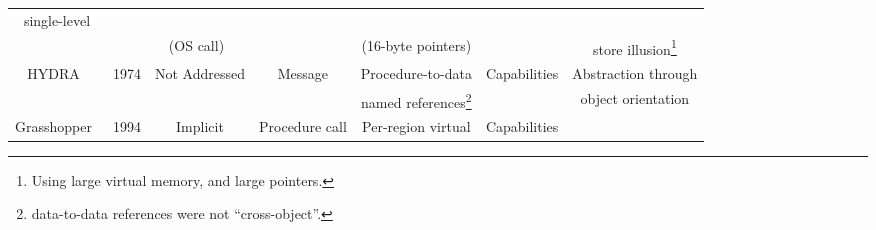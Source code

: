 {\begin{table}
\begin{minipage}{\textwidth}
\begin{tabular}{c c c c c c c}
                single-level                                                                                                                                                                                                                                                                                                                                                                \\
                                                                        &                                           & (OS call)~\cite{shapiro:usenix02}         &                        & (16-byte pointers)                                                            &                          & store illusion\footnote{Using
                large virtual memory, and large pointers.}                                                                                                                                                                                                                                                                                                                                  \\
                \midrule
                HYDRA~\cite{wulf:cacm74}                                & 1974                                      & Not Addressed                             & Message                & Procedure-to-data                                                             & Capabilities             &
                Abstraction through                                                                                                                                                                                                                                                                                                                                                         \\
                                                                        &                                           &                                           &                        & named references\footnote{data-to-data references were not ``cross-object''.} &                          & object orientation                                                                    \\
                \midrule
                Grasshopper~\cite{dearli:cs94}                          & 1994                                      & Implicit                                  & Procedure call         & Per-region virtual                                                            & Capabilities

\end{tabular}
\end{minipage}
\end{table}}
